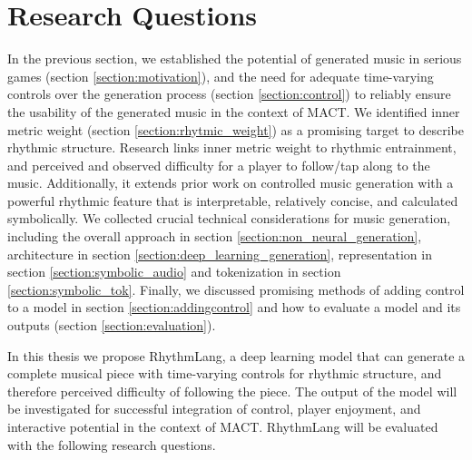 

\chapter{Research Questions}
\label{chap:researchquestions}
\pagestyle{fancy}

In the previous section, we established the potential of generated music in serious games (section \ref{section:motivation}), and the need for adequate time-varying controls over the generation process (section \ref{section:control}) to reliably ensure the usability of the generated music in the context of MACT. We identified inner metric weight (section \ref{section:rhytmic_weight}) as a promising target to describe rhythmic structure. Research links inner metric weight to rhythmic entrainment, and perceived and observed difficulty for a player to follow/tap along to the music. Additionally, it extends prior work on controlled music generation with a powerful rhythmic feature that is interpretable, relatively concise, and calculated symbolically. 
We collected crucial technical considerations for music generation, including the overall approach in section \ref{section:non_neural_generation}, architecture in section \ref{section:deep_learning_generation}, representation in section \ref{section:symbolic_audio} and tokenization in section \ref{section:symbolic_tok}. Finally, we discussed promising methods of adding control to a model in section \ref{section:addingcontrol} and how to evaluate a model and its outputs (section \ref{section:evaluation}). 

In this thesis we propose RhythmLang, a deep learning model that can generate a complete musical piece with time-varying controls for rhythmic structure, and therefore perceived difficulty of following the piece. The output of the model will be investigated for successful integration of control, player enjoyment, and interactive potential in the context of MACT. RhythmLang will be evaluated with the following research questions.

